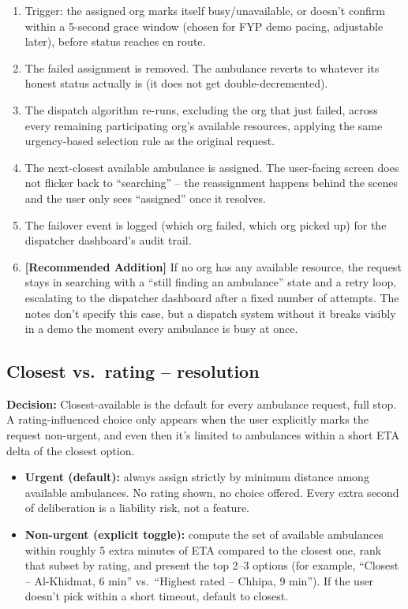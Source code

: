 \documentclass[11pt,a4paper]{article}
\begin{document}
\begin{enumerate}
  \item Trigger: the assigned org marks itself busy/unavailable, or doesn't confirm within a 5-second grace window (chosen for FYP demo pacing, adjustable later), before status reaches en route.
  \item The failed assignment is removed. The ambulance reverts to whatever its honest status actually is (it does not get double-decremented).
  \item The dispatch algorithm re-runs, excluding the org that just failed, across every remaining participating org's available resources, applying the same urgency-based selection rule as the original request.
  \item The next-closest available ambulance is assigned. The user-facing screen does not flicker back to ``searching'' -- the reassignment happens behind the scenes and the user only sees ``assigned'' once it resolves.
  \item The failover event is logged (which org failed, which org picked up) for the dispatcher dashboard's audit trail.
  \item \textbf{[Recommended Addition]} If no org has any available resource, the request stays in searching with a ``still finding an ambulance'' state and a retry loop, escalating to the dispatcher dashboard after a fixed number of attempts. The notes don't specify this case, but a dispatch system without it breaks visibly in a demo the moment every ambulance is busy at once.
\end{enumerate}

\subsection{Closest vs.\ rating -- resolution}

\textbf{Decision:} Closest-available is the default for every ambulance request, full stop. A rating-influenced choice only appears when the user explicitly marks the request non-urgent, and even then it's limited to ambulances within a short ETA delta of the closest option.

\begin{itemize}
  \item \textbf{Urgent (default):} always assign strictly by minimum distance among available ambulances. No rating shown, no choice offered. Every extra second of deliberation is a liability risk, not a feature.
  \item \textbf{Non-urgent (explicit toggle):} compute the set of available ambulances within roughly 5 extra minutes of ETA compared to the closest one, rank that subset by rating, and present the top 2--3 options (for example, ``Closest -- Al-Khidmat, 6 min'' vs.\ ``Highest rated -- Chhipa, 9 min''). If the user doesn't pick within a short timeout, default to closest.
\end{itemize}
\end{document}
